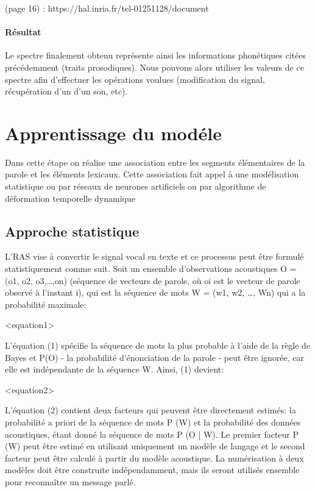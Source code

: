 \documentclass[a4paper, 12pt]{book}
\begin{document}
(page 16) : https://hal.inria.fr/tel-01251128/document

\subsubsection{Résultat}

Le spectre finalement obtenu représente ainsi les informations phonétiques citées précédemment (traits prosodiques). Nous pouvons alors utiliser les valeurs de ce spectre afin d’effectuer les opérations voulues (modification du signal, récupération d’un d’un son, etc).



\chapter{Apprentissage du modéle}

Dans cette étape on réalise une association entre les segments élémentaires de la parole et les éléments lexicaux. Cette association fait appel à une modélisation statistique ou par réseaux de neurones artificiels ou par algorithme de déformation temporelle dynamique

\section{Approche statistique}

L’RAS vise à convertir le signal vocal en texte et ce processus peut être formulé statistiquement comme suit. Soit un ensemble d'observations acoustiques O = (o1, o2, o3,…,on) (séquence de vecteurs de parole, où oi est le vecteur de parole observé à l'instant i), qui est la séquence de mots W = (w1, w2, …, Wn) qui a la probabilité maximale:

<equation1>

L'équation (1) spécifie la séquence de mots la plus probable à l'aide de la règle de Bayes et P(O) - la probabilité d'énonciation de la parole - peut être ignorée, car elle est indépendante de la séquence W. Ainsi, (1) devient:

<equation2>

L'équation (2) contient deux facteurs qui peuvent être directement estimés: la probabilité a priori de la séquence de mots P (W) et la probabilité des données acoustiques, étant donné la séquence de mots P (O | W). Le premier facteur P (W) peut être estimé en utilisant uniquement un modèle de langage et le second facteur peut être calculé à partir du modèle acoustique. La numérisation à deux modèles doit être construite indépendamment, mais ils seront utilisés ensemble pour reconnaître un message parlé.
\end{document}
